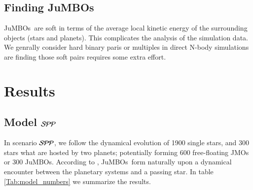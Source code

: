 \documentclass[aa]{lib/aa}
\newcommand{\jumbos}{\mbox{JuMBOs}}
\begin{document}
\subsection{Finding \jumbos}

\jumbos\, are soft in terms of the average local kinetic energy of the
surrounding objects (stars and planets). This complicates the analysis
of the simulation data. We genrally consider hard binary paris or
multiples in direct N-body simulations are finding those soft pairs
requires some extra effort.

\section{Results}

\subsection{Model ${\cal SPP}$}

In scenario ${\cal SPP}$, we follow the dynamical evolution of 1900
single stars, and 300 stars what are hosted by two planets;
potentially forming 600 free-floating JMOs or 300 \jumbos.  According
to \citep{2023arXiv231006016W}, \jumbos\, form naturally upon a
dynamical encounter between the planetary systems and a passing star.
In table\,\ref{Tab:model_numbers} we summarize the results.
\end{document}
